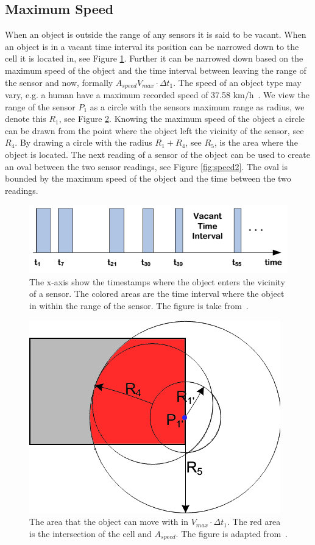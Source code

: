 \subsection{Maximum Speed}
\label{sec:speed}
When an object is outside the range of any sensors it is said to be vacant.
When an object is in a vacant time interval its position can be narrowed down to the cell it is located in, see Figure \ref{fig:vacant}. 
Further it can be narrowed down based on the maximum speed of the object and the time interval between leaving the range of the sensor and now, formally $A_{speed} V_{max}\cdot\Delta t_1$. 
The speed of an object type may vary, e.g. a human have a maximum recorded speed of 37.58 km/h~\cite{bolt}.
We view the range of the sensor $P_1$ as a circle with the sensors maximum range as radius, we denote this $R_1$, see Figure \ref{fig:speed1}.
Knowing the maximum speed of the object a circle can be drawn from the point where the object left the vicinity of the sensor, see $R_4$.
By drawing a circle with the radius $R_1 + R_4$, see $R_5$, is the area where the object is located. 
The next reading of a sensor of the object can be used to create an oval between the two sensor readings, see Figure \ref{fig:speed2}.  
The oval is bounded by the maximum speed of the object and the time between the two readings. 

\begin{figure}%
\centering
\includegraphics[width=\columnwidth]{images/vacant.png}%
\caption{The x-axis show the timestamps where the object enters the vicinity of a sensor. The colored areas are the time interval where the object in within the range of the sensor. The figure is take from~\cite{Jensen:2009:GMB:1590953.1591000}.}%
\label{fig:vacant}%
\end{figure}

\begin{figure}%
\centering
\includegraphics[width=0.5\columnwidth]{images/speed.png}%
\caption{The area that the object can move with in $V_{max}\cdot\Delta t_1$. The red area is the intersection of the cell and $A_{speed}$. The figure is adapted from~\cite{Jensen:2009:GMB:1590953.1591000}.}%
\label{fig:speed1}%
\end{figure}

